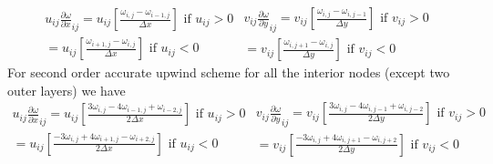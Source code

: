 \documentclass{article}
\begin{document}
\begin{subequations}
\begin{equation} 
\begin{split}
u_{ij}\frac{\partial \omega}{\partial x}_{ij} = u_{ij}\left[\frac{\omega_{i,j}-\omega_{i-1,j}}{\Delta x}\right] \text{  if  } u_{ij}>0 \\ = u_{ij}\left[\frac{\omega_{i+1,j}-\omega_{i,j}}{\Delta x}\right] \text{  if  } u_{ij}<0
\end{split}
\end{equation}

\begin{equation} 
\begin{split}
v_{ij}\frac{\partial \omega}{\partial y}_{ij} = v_{ij}\left[\frac{\omega_{i,j}-\omega_{i,j-1}}{\Delta y}\right] \text{  if  } v_{ij}>0 \\ = v_{ij}\left[\frac{\omega_{i,j+1}-\omega_{i,j}}{\Delta y}\right] \text{  if  } v_{ij}<0
\end{split}
\end{equation}
\end{subequations}
For second order accurate upwind scheme for all the interior nodes (except two outer layers) we have
\begin{subequations}
\begin{equation} 
\begin{split}
u_{ij}\frac{\partial \omega}{\partial x}_{ij} = u_{ij}\left[\frac{3\omega_{i,j}-4\omega_{i-1,j}+\omega_{i-2,j}}{2\Delta x}\right] \text{  if  } u_{ij}>0 \\ = u_{ij}\left[\frac{-3\omega_{i,j}+4\omega_{i+1,j}-\omega_{i+2,j}}{2\Delta x}\right] \text{  if  } u_{ij}<0
\end{split}
\end{equation}

\begin{equation} 
\begin{split}
v_{ij}\frac{\partial \omega}{\partial y}_{ij} = v_{ij}\left[\frac{3\omega_{i,j}-4\omega_{i,j-1}+\omega_{i,j-2}}{2\Delta y}\right] \text{  if  } v_{ij}>0 \\ = v_{ij}\left[\frac{-3\omega_{i,j}+4\omega_{i,j+1}-\omega_{i,j+2}}{2\Delta y}\right] \text{  if  } v_{ij}<0
\end{split}
\end{equation}
\end{subequations}
\end{document}
